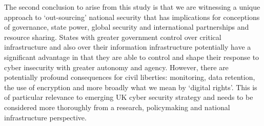 \documentclass[a4paper,11pt]{article}
\begin{document}
The second conclusion to arise from this study is that we are
witnessing a unique approach to `out-sourcing' national security that
has implications for conceptions of governance, state power, global
security and international partnerships and resource sharing. States
with greater government control over critical infrastructure and also
over their information infrastructure potentially have a significant
advantage in that they are able to control and shape their response to
cyber insecurity with greater autonomy and agency. However, there are
potentially profound consequences for civil liberties: monitoring,
data retention, the use of encryption and more broadly what we mean by
`digital rights'. This is of particular relevance to emerging UK cyber
security strategy and needs to be considered more thoroughly from a
research, policymaking and national infrastructure perspective.



\end{document}
